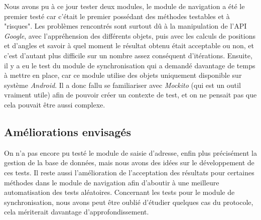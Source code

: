 Nous avons pu à ce jour tester deux modules, le module de navigation a été le premier testé car c'était le premier possédant des méthodes testables et à "risques". Les problèmes rencontrés sont surtout dû à la manipulation de l'API \textit{Google}, avec l'appréhension des différents objets, puis avec les calculs de positions et d'angles et savoir à quel moment le résultat obtenu était acceptable ou non, et c'est d'autant plus difficile sur un nombre assez conséquent d'itérations. Ensuite, il y a eu le test du module de synchronisation qui a demandé davantage de temps à mettre en place, car ce module utilise des objets uniquement disponible sur système \textit{Android}. Il a donc fallu se familiariser avec \textit{Mockito} (qui est un outil vraiment utile) afin de pouvoir créer un contexte de test, et on ne pensait pas que cela pouvait être aussi complexe.

\subsection{Améliorations envisagés}

On n'a pas encore pu testé le module de saisie d'adresse, enfin plus précisément la gestion de la base de données, mais nous avons des idées sur le développement de ces tests. Il reste aussi l'amélioration de l'acceptation des résultats pour certaines méthodes dans le module de navigation afin d'aboutir à une meilleure automatisation des tests aléatoires. Concernant les tests pour le module de synchronisation, nous avons peut être oublié d'étudier quelques cas du protocole, cela mériterait davantage d'approfondissement. 